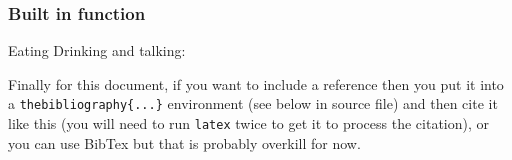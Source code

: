 \documentclass[a4wide, 10pt]{article}
\begin{document}
\subsubsection{Built in function}
Eating Drinking and talking: 




Finally for this document, if you want to include a reference
then you put it into a \texttt{thebibliography\{...\}}
environment (see below in source file) and then 
cite it like this \cite{lamport94}
(you will need to run \texttt{latex} twice to get it to process the citation),
or you can use BibTex but that is probably overkill for now.

\end{document}
